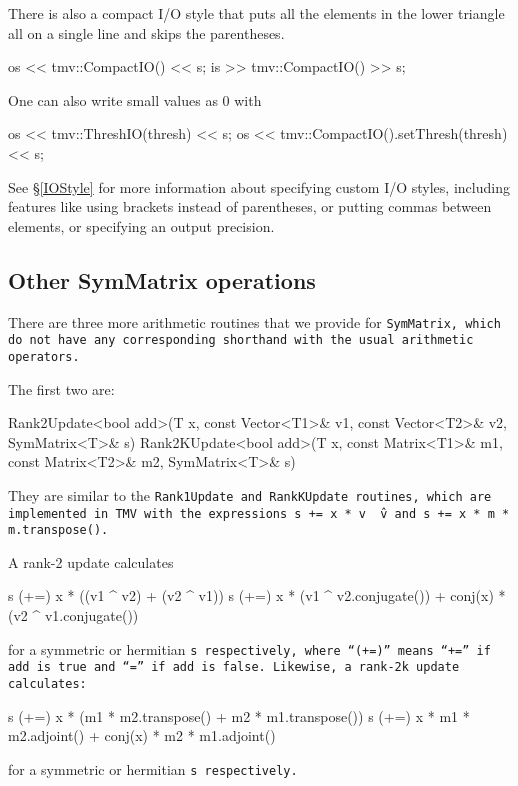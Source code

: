 There is also a compact I/O style that puts all the elements in the lower triangle all on a single line and skips the parentheses. 
\begin{tmvcode}
os << tmv::CompactIO() << s;
is >> tmv::CompactIO() >> s;
\end{tmvcode}

One can also write small values as 0 with
\begin{tmvcode}
os << tmv::ThreshIO(thresh) << s;
os << tmv::CompactIO().setThresh(thresh) << s;
\end{tmvcode}

See \S\ref{IOStyle} for more information about specifying custom I/O styles, including
features like using brackets instead of parentheses, or putting commas between elements,
or specifying an output precision.  

\subsection{Other SymMatrix operations}
\label{SymMatrix_Ops}

There are three more arithmetic routines that we provide for \tt{SymMatrix},
which do not have
any corresponding shorthand with the usual arithmetic operators.

The first two are:
\begin{tmvcode}
Rank2Update<bool add>(T x, const Vector<T1>& v1, const Vector<T2>& v2, 
      SymMatrix<T>& s)
Rank2KUpdate<bool add>(T x, const Matrix<T1>& m1, const Matrix<T2>& m2,
      SymMatrix<T>& s)
\end{tmvcode}
They are similar to the \tt{Rank1Update} and \tt{RankKUpdate} routines,
which are implemented in TMV with the expressions 
\tt{s += x * v \^\ v} and \tt{s += x * m * m.transpose()}.

A rank-2 update calculates
\begin{tmvcode}
s (+=) x * ((v1 ^ v2) + (v2 ^ v1))
s (+=) x * (v1 ^ v2.conjugate()) + conj(x) * (v2 ^ v1.conjugate())
\end{tmvcode}
for a symmetric or hermitian \tt{s} respectively,
where ``(+=)'' means ``+='' if \tt{add} is \tt{true} and ``='' 
if \tt{add} is \tt{false}.
Likewise, a rank-2k update calculates:
\begin{tmvcode}
s (+=) x * (m1 * m2.transpose() + m2 * m1.transpose())
s (+=) x * m1 * m2.adjoint() + conj(x) * m2 * m1.adjoint()
\end{tmvcode}
for a symmetric or hermitian \tt{s} respectively.

